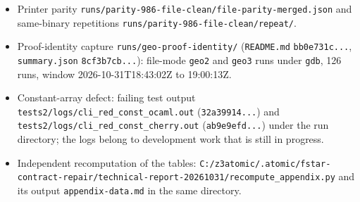 \documentclass[10pt,a4paper]{article}
\begin{document}
\begin{itemize}
\item Printer parity \texttt{runs/\allowbreak{}parity-{}\allowbreak{}986-{}\allowbreak{}file-{}\allowbreak{}clean/\allowbreak{}file-{}\allowbreak{}parity-{}\allowbreak{}merged.\allowbreak{}json} and same-binary repetitions \texttt{runs/\allowbreak{}parity-{}\allowbreak{}986-{}\allowbreak{}file-{}\allowbreak{}clean/\allowbreak{}repeat/\allowbreak{}}.

\item Proof-identity capture \texttt{runs/\allowbreak{}geo-{}\allowbreak{}proof-{}\allowbreak{}identity/\allowbreak{}} (\texttt{README.\allowbreak{}md} \texttt{bb0e731c.\allowbreak{}.\allowbreak{}.\allowbreak{}}, \texttt{summary.\allowbreak{}json} \texttt{8cf3b7cb.\allowbreak{}.\allowbreak{}.\allowbreak{}}): file-mode \texttt{geo2} and \texttt{geo3} runs under \texttt{gdb}, 126 runs, window 2026-10-31T18:43:02Z to 19:00:13Z.

\item Constant-array defect: failing test output \texttt{tests2/\allowbreak{}logs/\allowbreak{}cli\_\allowbreak{}red\_\allowbreak{}const\_\allowbreak{}ocaml.\allowbreak{}out} (\texttt{32a39914.\allowbreak{}.\allowbreak{}.\allowbreak{}}) and \texttt{tests2/\allowbreak{}logs/\allowbreak{}cli\_\allowbreak{}red\_\allowbreak{}const\_\allowbreak{}cherry.\allowbreak{}out} (\texttt{ab9e9efd.\allowbreak{}.\allowbreak{}.\allowbreak{}}) under the run directory; the logs belong to development work that is still in progress.

\item Independent recomputation of the tables: \texttt{C:\allowbreak{}/\allowbreak{}z3atomic/\allowbreak{}.\allowbreak{}atomic/\allowbreak{}fstar-{}\allowbreak{}contract-{}\allowbreak{}repair/\allowbreak{}technical-{}\allowbreak{}report-{}\allowbreak{}20261031/\allowbreak{}recompute\_\allowbreak{}appendix.\allowbreak{}py} and its output \texttt{appendix-{}\allowbreak{}data.\allowbreak{}md} in the same directory.

\end{itemize}
\end{document}
